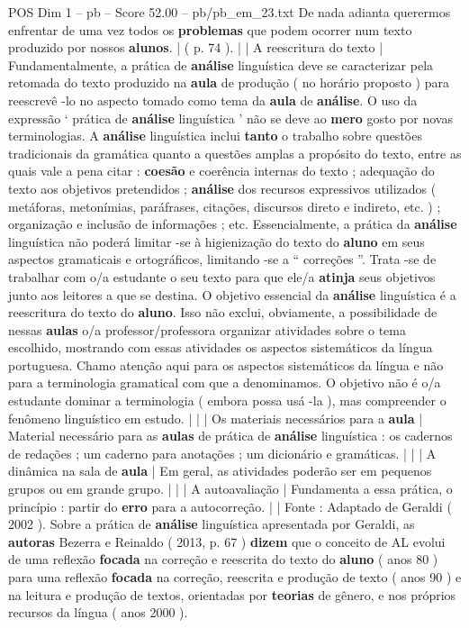 \begin{textsample}{POS Dim 1 – pb – Score 52.00 – pb/pb\_em\_23.txt}
De nada adianta querermos enfrentar de uma vez todos os \textbf{problemas} que podem ocorrer num texto produzido por nossos \textbf{alunos}. | ( p. 74 ). | | A reescritura do texto | Fundamentalmente, a prática de \textbf{análise} linguística deve se caracterizar pela retomada do texto produzido na \textbf{aula} de produção ( no horário proposto ) para reescrevê -lo no aspecto tomado como tema da \textbf{aula} de \textbf{análise}.
O uso da expressão ‘ prática de \textbf{análise} linguística ’ não se deve ao \textbf{mero} gosto por novas terminologias.
A \textbf{análise} linguística inclui \textbf{tanto} o trabalho sobre questões tradicionais da gramática quanto a questões amplas a propósito do texto, entre as quais vale a pena citar : \textbf{coesão} e coerência internas do texto ; adequação do texto aos objetivos pretendidos ; \textbf{análise} dos recursos expressivos utilizados ( metáforas, metonímias, paráfrases, citações, discursos direto e indireto, etc. ) ; organização e inclusão de informações ; etc.
Essencialmente, a prática da \textbf{análise} linguística não poderá limitar -se à higienização do texto do \textbf{aluno} em seus aspectos gramaticais e ortográficos, limitando -se a “ correções ”.
Trata -se de trabalhar com o/a estudante o seu texto para que ele/a \textbf{atinja} seus objetivos junto aos leitores a que se destina.
O objetivo essencial da \textbf{análise} linguística é a reescritura do texto do \textbf{aluno}.
Isso não exclui, obviamente, a possibilidade de nessas \textbf{aulas} o/a professor/professora organizar atividades sobre o tema escolhido, mostrando com essas atividades os aspectos sistemáticos da língua portuguesa.
Chamo atenção aqui para os aspectos sistemáticos da língua e não para a terminologia gramatical com que a denominamos.
O objetivo não é o/a estudante dominar a terminologia ( embora possa usá -la ), mas compreender o fenômeno linguístico em estudo. | | | Os materiais necessários para a \textbf{aula} | Material necessário para as \textbf{aulas} de prática de \textbf{análise} linguística : os cadernos de redações ; um caderno para anotações ; um dicionário e gramáticas. | | | A dinâmica na sala de \textbf{aula} | Em geral, as atividades poderão ser em pequenos grupos ou em grande grupo. | | | A autoavaliação | Fundamenta a essa prática, o princípio : partir do \textbf{erro} para a autocorreção. | | Fonte : Adaptado de Geraldi ( 2002 ).
Sobre a prática de \textbf{análise} linguística apresentada por Geraldi, as \textbf{autoras} Bezerra e Reinaldo ( 2013, p. 67 ) \textbf{dizem} que o conceito de AL evolui de uma reflexão \textbf{focada} na correção e reescrita do texto do \textbf{aluno} ( anos 80 ) para uma reflexão \textbf{focada} na correção, reescrita e produção de texto ( anos 90 ) e na leitura e produção de textos, orientadas por \textbf{teorias} de gênero, e nos próprios recursos da língua ( anos 2000 ).

\end{textsample}
